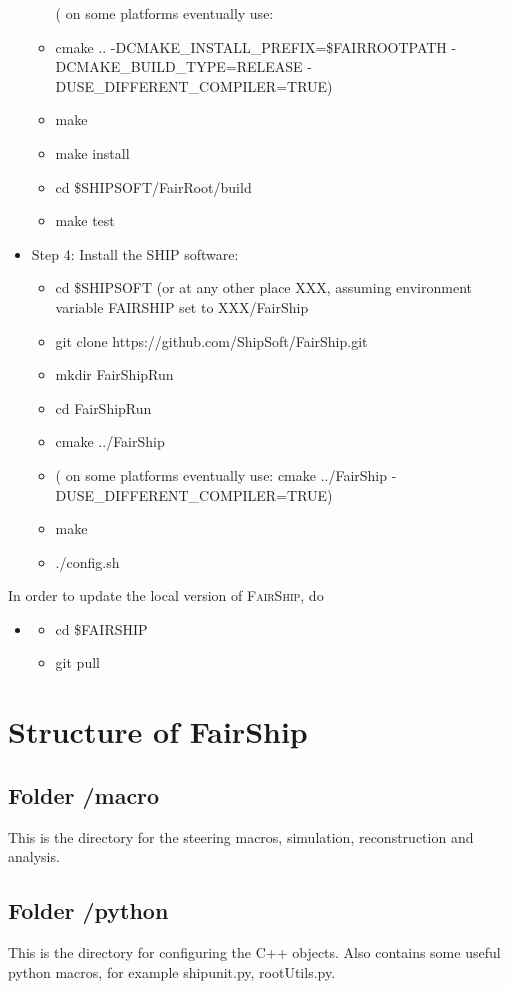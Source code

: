 \documentclass[12pt,a4paper]{article}
\begin{document}
\begin{itemize}
\begin{itemize}
 (  on some platforms eventually use: 
 \item cmake .. -DCMAKE\_INSTALL\_PREFIX=\$FAIRROOTPATH -DCMAKE\_BUILD\_TYPE=RELEASE -DUSE\_DIFFERENT\_COMPILER=TRUE)
 \item make
 \item make install
 \item cd \$SHIPSOFT/FairRoot/build
 \item make test
 \end{itemize}
\item Step 4: Install the SHIP software:
\begin{itemize}
 \item cd \$SHIPSOFT (or at any other place XXX, assuming environment variable FAIRSHIP set to XXX/FairShip
 \item git clone https://github.com/ShipSoft/FairShip.git
 \item mkdir FairShipRun
 \item cd FairShipRun
 \item cmake ../FairShip
 \item (  on some platforms eventually use:  cmake ../FairShip -DUSE\_DIFFERENT\_COMPILER=TRUE)
 \item make
 \item ./config.sh
 \end{itemize}
\end{itemize}

In order to update the local version of \textsc{FairShip}, do 
\begin{itemize}
 \item
 \begin{itemize}
  \item cd \$FAIRSHIP 
  \item git pull 
 \end{itemize}
\end{itemize}

\section{Structure of FairShip}
\subsection{Folder /macro}
This is the directory for the steering macros, simulation, reconstruction and analysis. 

\subsection{Folder /python}
This is the directory for configuring the C++ objects. Also contains some useful python macros, for example shipunit.py, rootUtils.py. 
\end{document}

